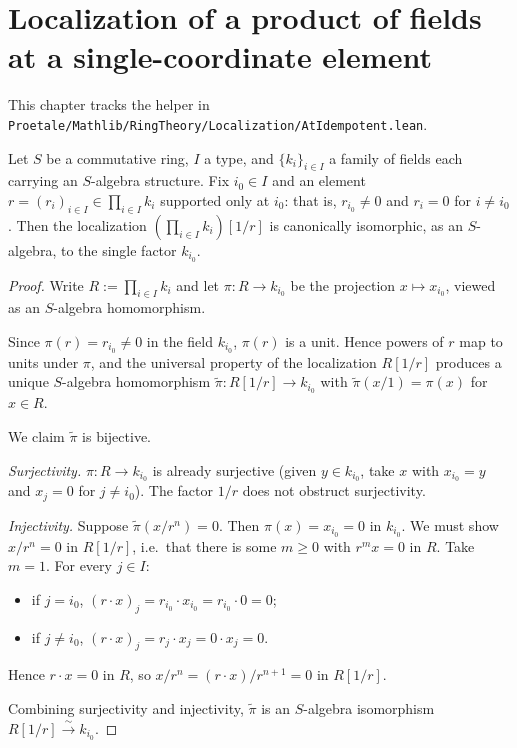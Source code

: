 \chapter{Localization of a product of fields at a single-coordinate element}
\label{chap:Mathlib_RingTheory_Localization_AtIdempotent}

This chapter tracks the helper
in \texttt{Proetale/Mathlib/RingTheory/Localization/AtIdempotent.lean}.

\begin{theorem}
  \label{thm:localization-away-pi-field-supported-at}
  \leanok
  Let $S$ be a commutative ring, $I$ a type, and $\{k_i\}_{i \in I}$ a
  family of fields each carrying an $S$-algebra structure. Fix
  $i_0 \in I$ and an element $r = (r_i)_{i \in I} \in \prod_{i \in I} k_i$
  supported only at $i_0$: that is, $r_{i_0} \neq 0$ and $r_i = 0$ for
  $i \neq i_0$. Then the localization $(\prod_{i \in I} k_i)[1/r]$ is
  canonically isomorphic, as an $S$-algebra, to the single factor
  $k_{i_0}$.
\end{theorem}
\begin{proof}
  \leanok
  Write $R := \prod_{i \in I} k_i$ and let $\pi : R \to k_{i_0}$ be the
  projection $x \mapsto x_{i_0}$, viewed as an $S$-algebra homomorphism.

  Since $\pi(r) = r_{i_0} \neq 0$ in the field $k_{i_0}$, $\pi(r)$ is a
  unit. Hence powers of $r$ map to units under $\pi$, and the universal
  property of the localization $R[1/r]$ produces a unique $S$-algebra
  homomorphism $\widetilde{\pi} : R[1/r] \to k_{i_0}$ with
  $\widetilde{\pi}(x/1) = \pi(x)$ for $x \in R$.

  We claim $\widetilde{\pi}$ is bijective.

  \emph{Surjectivity.} $\pi : R \to k_{i_0}$ is already surjective
  (given $y \in k_{i_0}$, take $x$ with $x_{i_0} = y$ and $x_j = 0$ for
  $j \neq i_0$). The factor $1/r$ does not obstruct surjectivity.

  \emph{Injectivity.} Suppose $\widetilde{\pi}(x/r^n) = 0$. Then
  $\pi(x) = x_{i_0} = 0$ in $k_{i_0}$. We must show $x/r^n = 0$ in
  $R[1/r]$, i.e.\ that there is some $m \geq 0$ with $r^m x = 0$ in $R$.
  Take $m = 1$. For every $j \in I$:
  \begin{itemize}
    \item if $j = i_0$, $(r \cdot x)_j = r_{i_0} \cdot x_{i_0} =
      r_{i_0} \cdot 0 = 0$;
    \item if $j \neq i_0$, $(r \cdot x)_j = r_j \cdot x_j = 0 \cdot x_j
      = 0$.
  \end{itemize}
  Hence $r \cdot x = 0$ in $R$, so $x/r^n = (r \cdot x)/r^{n+1} = 0$
  in $R[1/r]$.

  Combining surjectivity and injectivity, $\widetilde{\pi}$ is an
  $S$-algebra isomorphism $R[1/r] \xrightarrow{\sim} k_{i_0}$.
\end{proof}
